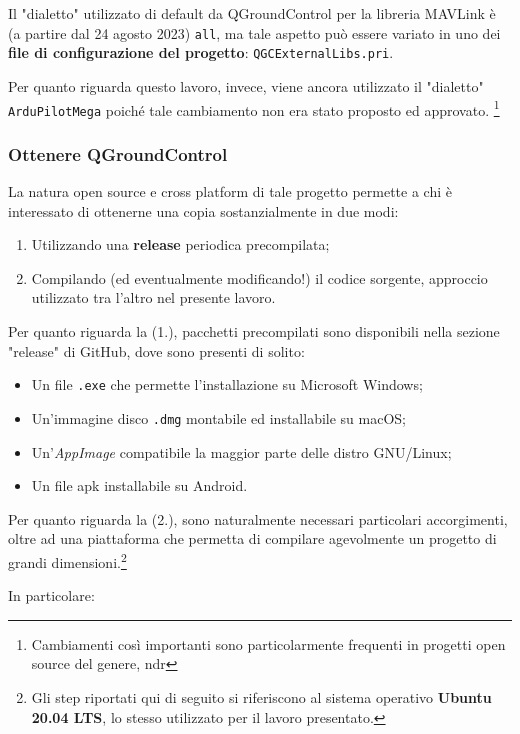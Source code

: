 \documentclass[a4paper, 12pt, oneside]{article}
\begin{document}
Il "dialetto" utilizzato di default da QGroundControl per la libreria MAVLink è (a partire dal 24 agosto 2023)\cite{qgc-all-commit} \texttt{all}, ma tale aspetto può essere variato in uno dei \textbf{file di configurazione del progetto}: \texttt{QGCExternalLibs.pri}.

Per quanto riguarda questo lavoro, invece, viene ancora utilizzato il "dialetto" \texttt{ArduPilotMega} poiché tale cambiamento non era stato proposto ed approvato. \footnote{Cambiamenti così importanti sono particolarmente frequenti in progetti open source del genere, ndr}

\subsubsection{Ottenere QGroundControl}
La natura open source e cross platform di tale progetto permette a chi è interessato di ottenerne una copia sostanzialmente in due modi:

\begin{enumerate}
    \item Utilizzando una \textbf{release} periodica precompilata;
    \item Compilando (ed eventualmente modificando!) il codice sorgente, approccio utilizzato tra l'altro nel presente lavoro.
\end{enumerate}

Per quanto riguarda la (1.), pacchetti precompilati sono disponibili nella sezione "release" di GitHub, dove sono presenti di solito:

\begin{itemize}
    \item Un file \texttt{.exe} che permette l'installazione su Microsoft Windows;
    \item Un'immagine disco \texttt{.dmg} montabile ed installabile su macOS;
    \item Un'\textit{AppImage} compatibile la maggior parte delle distro GNU/Linux;
    \item Un file apk installabile su Android.
\end{itemize}

Per quanto riguarda la (2.), sono naturalmente necessari particolari accorgimenti, oltre ad una piattaforma che permetta di compilare agevolmente un progetto di grandi dimensioni.\footnote{Gli step riportati qui di seguito si riferiscono al sistema operativo \textbf{Ubuntu 20.04 LTS}, lo stesso utilizzato per il lavoro presentato.}

In particolare:
\end{document}
